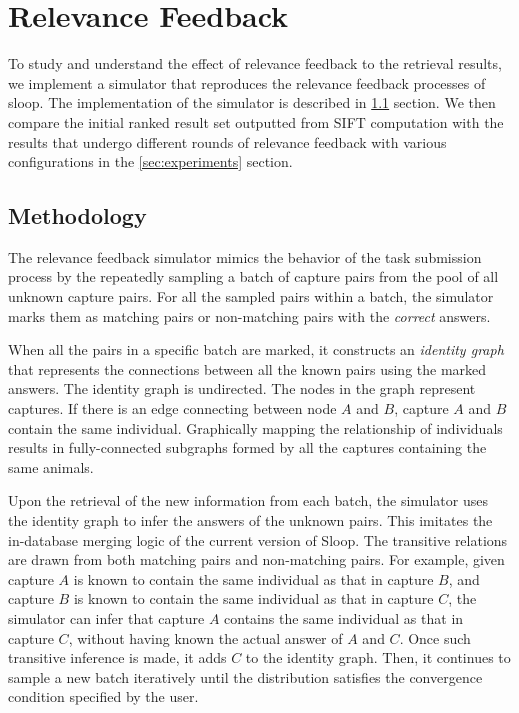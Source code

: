 \graphicspath{{./images/chap4/}}
\chapter{Relevance Feedback}
\label{chap:relevance_feedback}

To study and understand the effect of relevance feedback to the retrieval
results, we implement a simulator that reproduces the relevance feedback
processes of sloop. The implementation of the simulator is described in
\ref{sec:method} section. We then compare the initial ranked result set
outputted from SIFT computation with the results that undergo different rounds
of relevance feedback with various configurations in the \ref{sec:experiments}
section.

\section{Methodology}
\label{sec:method}

The relevance feedback simulator mimics the behavior of the task submission
process by the repeatedly sampling a batch of capture pairs from the pool of
all unknown capture pairs. For all the sampled pairs within a batch, the
simulator marks them as matching pairs or non-matching pairs with the
\emph{correct} answers.

When all the pairs in a specific batch are marked, it constructs an
\emph{identity graph} that represents the connections between all the known
pairs using the marked answers. The identity graph is undirected. The nodes in
the graph represent captures. If there is an edge connecting between node $A$
and $B$, capture $A$ and $B$ contain the same individual. Graphically mapping
the relationship of individuals results in fully-connected subgraphs formed by
all the captures containing the same animals.

Upon the retrieval of the new information from each batch, the simulator uses
the identity graph to infer the answers of the unknown pairs. This imitates the
in-database merging logic of the current version of Sloop\cite{sloopdocs}. The
transitive relations are drawn from both matching pairs and non-matching pairs.
For example, given capture $A$ is known to contain the same individual as that
in capture $B$, and capture $B$ is known to contain the same individual as that
in capture $C$, the simulator can infer that capture $A$ contains the same
individual as that in capture $C$, without having known the actual answer of
$A$ and $C$. Once such transitive inference is made, it adds $C$ to the
identity graph. Then, it continues to sample a new batch iteratively until the
distribution satisfies the convergence condition specified by the user.

